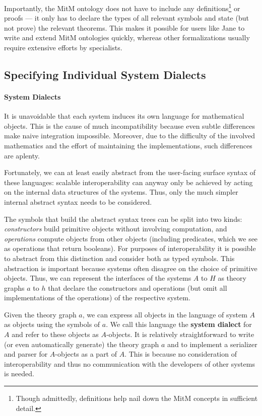 Importantly, the MitM ontology does not have to include any definitions\footnote{Though admittedly, definitions help nail down the MitM concepts in sufficient detail. } or proofs --- it only has to declare the types of all relevant symbols and state (but not prove) the relevant theorems.
This makes it possible for users like Jane to write and extend MitM ontologies quickly, whereas other formalizations usually require extensive efforts by specialists.

\subsection{Specifying Individual System Dialects}\label{sec:mitm:dialect}

\paragraph{System Dialects}
It is unavoidable that each system induces its own language for mathematical objects.
This is the cause of much incompatibility because even subtle differences make naive integration impossible.
Moreover, due to the difficulty of the involved mathematics and the effort of maintaining the implementations, such differences are aplenty.

Fortunately, we can at least easily abstract from the user-facing surface syntax of these languages:
scalable interoperability can anyway only be achieved by acting on the internal data structures of the systems.
Thus, only the much simpler internal abstract syntax needs to be considered.

The symbols that build the abstract syntax trees can be split into two kinds: \emph{constructors} build primitive objects without involving computation, and \emph{operations}
compute objects from other objects (including predicates, which we see as operations that return booleans).
For purposes of interoperability it is possible to abstract from this distinction and consider both as typed symbols.
This abstraction is important because systems often disagree on the choice of primitive objects.
Thus, we can represent the interfaces of the systems $A$ to $H$ as \OMMT theory graphs $a$ to $h$ that declare the constructors and operations (but omit all implementations of the operations) of the respective system.

Given the theory graph $a$, we can express all objects in the language of system $A$ as \OMMT objects using the symbols of $a$.
We call this language the \textbf{\OMMT system dialect} for $A$ and refer to these objects as $A$-objects.
It is relatively straightforward to write (or even automatically generate) the theory graph $a$ and to implement a serializer and parser for $A$-objects as a part of $A$.
This is because no consideration of interoperability and thus no communication with the developers of other systems is needed.

